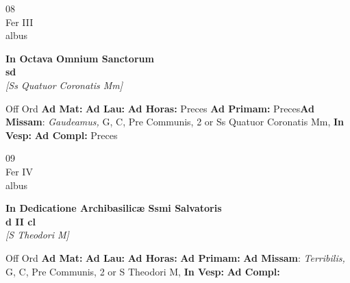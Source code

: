 \documentclass[10pt, openany]{book}
\begin{document}
    \begin{center}
        \begin{minipage}{3.5in}
            \vspace{2em}
            \begin{minipage}{0.5in}
                {\Huge 08} \\
                {\normalsize Fer III} \\
                {\normalsize albus}
            \end{minipage}
            \begin{minipage}{3.0in}
                \textbf{ \large In Octava Omnium Sanctorum \\
                \textnormal{\normalsize sd}} \\ \textit{[Ss Quatuor Coronatis Mm]} \\ 
            \end{minipage}
            \begin{justify}Off Ord
                \textbf{Ad Mat: }
                \textbf{Ad Lau: }
                \textbf{Ad Horas: }Preces
                \textbf{Ad Primam: }Preces\textbf{Ad Missam}: \textit{Gaudeamus,} G, C, Pre Communis, 2 or Ss Quatuor Coronatis Mm,  
                \textbf{In Vesp: }
                \textbf{Ad Compl: }Preces
            \end{justify}
        \end{minipage}
    \end{center}

    \begin{center}
        \begin{minipage}{3.5in}
            \vspace{2em}
            \begin{minipage}{0.5in}
                {\Huge 09} \\
                {\normalsize Fer IV} \\
                {\normalsize albus}
            \end{minipage}
            \begin{minipage}{3.0in}
                \textbf{ \large In Dedicatione Archibasilicæ Ssmi Salvatoris \\
                \textnormal{\normalsize d II cl}} \\ \textit{[S Theodori M]} \\ 
            \end{minipage}
            \begin{justify}Off Ord
                \textbf{Ad Mat: }
                \textbf{Ad Lau: }
                \textbf{Ad Horas: }
                \textbf{Ad Primam: }\textbf{Ad Missam}: \textit{Terribilis,} G, C, Pre Communis, 2 or S Theodori M,  
                \textbf{In Vesp: }
                \textbf{Ad Compl: }
            \end{justify}
        \end{minipage}
    \end{center}
\end{document}
